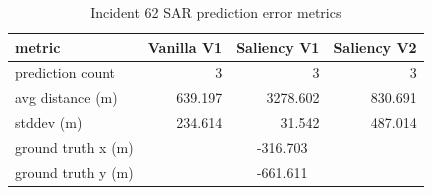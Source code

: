 \begin{table}[ht]
\centering
\caption{Incident 62 SAR prediction error metrics}
\label{tab:sar-incident-62}
\begin{tabular}{lrrr}
\hline
metric & Vanilla V1 & Saliency V1 & Saliency V2 \\
\hline
prediction count & 3 & 3 & 3 \\
avg distance (m) & 639.197 & 3278.602 & 830.691 \\
stddev (m) & 234.614 & 31.542 & 487.014 \\
ground truth x (m) & \multicolumn{3}{c}{-316.703} \\
ground truth y (m) & \multicolumn{3}{c}{-661.611} \\
\hline
\end{tabular}
\end{table}
